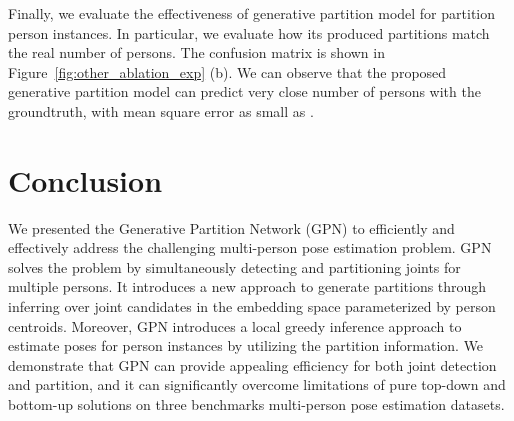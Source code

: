 \documentclass[10pt,twocolumn,letterpaper]{article}
\begin{document}
Finally, we evaluate the effectiveness of generative partition model for partition  person instances. In particular, we evaluate how its produced partitions match the real number of persons. The confusion matrix is shown in Figure~\ref{fig:other_ablation_exp} (b). We can observe that the proposed generative partition model can predict very close number of persons with the groundtruth, with   mean square error as small as .


\section{Conclusion}

We  presented the Generative Partition Network (GPN) to efficiently and effectively address the challenging multi-person pose estimation problem. GPN solves the problem by simultaneously detecting and partitioning joints for multiple persons. It introduces a new approach to generate partitions through inferring over joint candidates in the  embedding space parameterized by person centroids. Moreover, GPN introduces a local greedy inference approach to estimate poses for person instances by utilizing the partition information. We demonstrate that GPN can provide appealing efficiency for both joint detection and  partition, and it can significantly overcome limitations of pure top-down and bottom-up solutions on three benchmarks multi-person pose estimation datasets.



{\small


}
\end{document}
